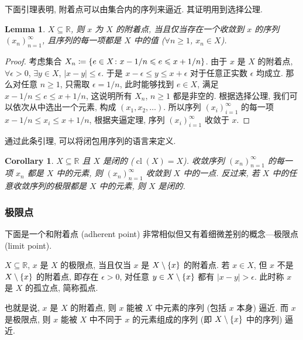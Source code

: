 \documentclass[UTF8]{ctexart}
\theoremstyle{mystyle}
\newtheorem{lemma}{Lemma}[section]
\theoremstyle{myremark}
\theoremstyle{plain}
\newtheorem{corollary}{Corollary}[section]
\newcommand{\R}{\mathbb R}
\DeclarePairedDelimiter\set{\{}{\}}
\DeclareMathOperator{\cl}{cl}
\begin{document}
下面引理表明, 附着点可以由集合内的序列来逼近. 其证明用到选择公理.
\begin{lemma}
    $ X \subseteq \R $, 则 $ x $ 为 $ X $ 的附着点, 当且仅当存在一个收敛到 $ x $ 的序列 $ (x_n)_{n = 1}^\infty $, 且序列的每一项都是 $ X $ 中的值 ($ \forall n \geqslant 1 $, $ x_n \in X $).
\end{lemma}

\begin{proof}
    考虑集合 $ X_n \coloneqq \set{e \in X \colon x - 1/n \leqslant e \leqslant x + 1/n} $. 由于 $ x $ 是 $ X $ 的附着点, $ \forall \epsilon > 0 $, $ \exists y \in X $, $ |x - y| \leqslant \epsilon $. 于是 $ x - \epsilon \leqslant y \leqslant x + \epsilon $ 对于任意正实数 $ \epsilon $ 均成立. 那么对任意 $ n \geqslant 1 $, 只需取 $ \epsilon = 1/n $, 此时能够找到 $ e \in X $, 满足 $ x - 1/n \leqslant e \leqslant x + 1/n $, 这说明所有 $ X_n $, $ n \geqslant 1 $ 都是非空的. 根据选择公理, 我们可以依次从中选出一个元素, 构成 $ (x_1, x_2, \dots) $. 所以序列 $ (x_i)_{i = 1}^\infty $ 的每一项 $ x - 1/n \leqslant x_i \leqslant x + 1/n $, 根据夹逼定理, 序列 $ (x_i)_{i = 1}^\infty $ 收敛于 $ x $.
\end{proof}

通过此条引理, 可以将闭包用序列的语言来定义.

\begin{corollary}
    $ X \subseteq \R $ 且 $ X $ 是闭的 ($ \cl(X) = X $). 收敛序列 $ (x_n)_{n = 1}^\infty $ 的每一项 $ x_n $ 都是 $ X $ 中的元素, 则 $ (x_n)_{n = 1}^\infty $ 收敛到 $ X $ 中的一点. 反过来, 若 $ X $ 中的任意收敛序列的极限都是 $ X $ 中的元素, 则 $ X $ 是闭的.
\end{corollary}

\subsubsection{极限点}
下面是一个和附着点 (adherent point) 非常相似但又有着细微差别的概念---极限点 (limit point).

\begin{definition}
    $ X \subseteq \R $, $ x $ 是 $ X $ 的极限点, 当且仅当 $ x $ 是 $ X \setminus \set{x} $ 的附着点. 若 $ x \in X $, 但 $ x $ 不是 $ X \setminus \set{x} $ 的附着点, 即存在 $ \epsilon > 0 $, 对任意 $ y \in X \setminus \set{x} $ 都有 $ |x - y| > \epsilon $. 此时称 $ x $ 是 $ X $ 的孤立点, 简称孤点.
\end{definition}

也就是说, $ x $ 是 $ X $ 的附着点, 则 $ x $ 能被 $ X $ 中元素的序列 (包括 $ x $ 本身) 逼近. 而 $ x $ 是极限点, 则 $ x $ 能被 $ X $ 中不同于 $ x $ 的元素组成的序列 (即 $ X \setminus \set{x} $ 中的序列) 逼近. 
\end{document}
